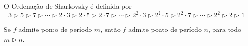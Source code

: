 \begin{definition}
\begin{definition}
O Ordenação de Sharkovsky é definida por
$$3 \triangleright 5 \triangleright 7 \triangleright \cdots
\triangleright 2 \cdot 3 \triangleright 2 \cdot 5 \triangleright 2 \cdot 7 \triangleright \cdots
\triangleright 2^2 \cdot 3 \triangleright 2^2 \cdot 5 \triangleright 2^2 \cdot 7 \triangleright \cdots
\triangleright 2^2 \triangleright 2 \triangleright 1$$
\end{definition}

\begin{theorem}
Se $f$ admite ponto de período $m$, então $f$ admite ponto de período $n$, para todo $m \triangleright n$.
\end{theorem}

\end{definition}